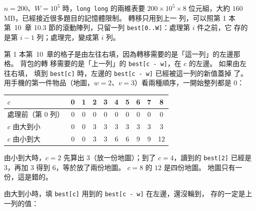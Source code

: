 $n = 200$、$W = 10^5$ 時，\texttt{long long} 的兩維表要 $200 \times 10^5
\times 8$ 位元組，大約 $160$ MB，已經接近很多題目的記憶體限制。 轉移只用到上一
列，可以照第 1 本第~10~章 10.3 節的滾動陣列，只留一列 \texttt{best[0..W]}：處理第 $i$ 件之前，它
存的是第 $i - 1$ 列；處理完，變成第 $i$ 列。

第 1 本第~10~章的格子是由左往右填，因為轉移需要的是「這一列」的左邊那格。 背包的轉
移需要的是「上一列」的 \texttt{best[c - w]}，在 $c$ 的左邊。 如果由左往右填，
填到 \texttt{best[c]} 時，左邊的 \texttt{best[c - w]} 已經被這一列的新值蓋掉
了。 用手機的第一件物品（地圖，$w = 2$、$v = 3$）看兩種順序，一開始整列都是
$0$：

\begin{center}
\begin{tabular}{l|ccccccccc}
\toprule
$c$ & 0 & 1 & 2 & 3 & 4 & 5 & 6 & 7 & 8 \\
\midrule
處理前（第 $0$ 列） & 0 & 0 & 0 & 0 & 0 & 0 & 0 & 0 & 0 \\
$c$ 由大到小 & 0 & 0 & 3 & 3 & 3 & 3 & 3 & 3 & 3 \\
$c$ 由小到大 & 0 & 0 & 3 & 3 & 6 & 6 & 9 & 9 & 12 \\
\bottomrule
\end{tabular}
\end{center}

由小到大時，$c = 2$ 先算出 $3$（放一份地圖）；到了 $c = 4$，讀到的
\texttt{best[2]} 已經是 $3$，再加 $3$ 得到 $6$，等於放了兩份地圖。 $c = 8$
的 $12$ 是四份地圖。 地圖只有一份，這是錯的。

由大到小時，填 \texttt{best[c]} 用到的 \texttt{best[c - w]} 在左邊，還沒輪到，
存的一定是上一列的值：

\begin{center}
\label{fig:knap-reverse}
\end{center}

